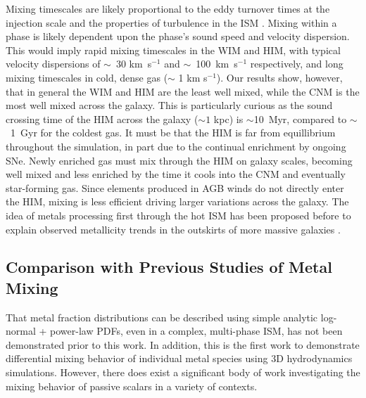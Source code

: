 %
%
%

Mixing timescales are likely proportional to the eddy turnover times at the injection scale \citep{PanScannapieco2010, Colbrook2017} and the properties of turbulence in the ISM \citep{YangKrumholz2012,Sarmento2017,Sarmento2018}. Mixing within a phase is likely dependent upon the phase's sound speed and velocity dispersion. This would imply rapid mixing timescales in the WIM and HIM, with typical velocity dispersions of $\sim$~30 km~s$^{-1}$ and $\sim$~100~km~s$^{-1}$ respectively, and long mixing timescales in cold, dense gas ($\sim$ 1 km s$^{-1}$). Our results show, however, that in general the WIM and HIM are the least well mixed, while the CNM is the most well mixed across the galaxy. This is particularly curious as the sound crossing time of the HIM across the galaxy ($\sim 1$ kpc) is $\sim$10~Myr, compared to $\sim$~1~Gyr for the coldest gas. It must be that the HIM is far from equillibrium throughout the simulation, in part due to the continual enrichment by ongoing SNe. Newly enriched gas must mix through the HIM on galaxy scales, becoming well mixed and less enriched by the time it cools into the CNM and eventually star-forming gas. Since elements produced in AGB winds do not directly enter the HIM, mixing is less efficient driving larger variations across the galaxy. The idea of metals processing first through the hot ISM has been proposed before to explain observed metallicity trends in the outskirts of more massive galaxies \citep{Tassis2008,Werk2011}.

\subsection{Comparison with Previous Studies of Metal Mixing}
\label{ch3:sec:context}
That metal fraction distributions can be described using simple analytic log-normal + power-law PDFs, even in a complex, multi-phase ISM, has not been demonstrated prior to this work. In addition, this is the first work to demonstrate differential mixing behavior of individual metal species using 3D hydrodynamics simulations. However, there does exist a significant body of work investigating the mixing behavior of passive scalars in a variety of contexts.

